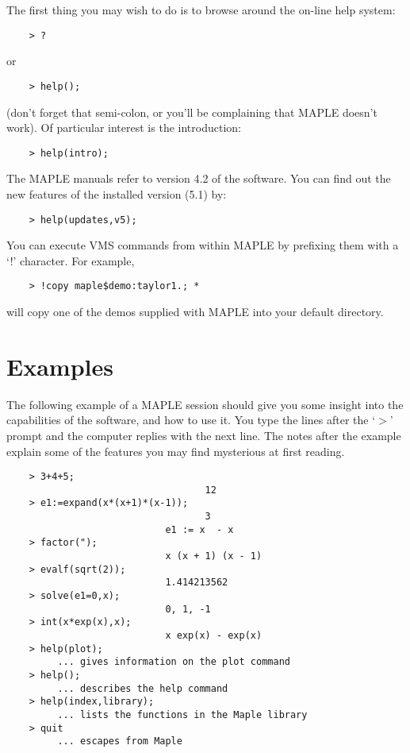 The first thing you may wish to do is to browse around the on-line help
system:

\begin{verbatim}
    > ?
\end{verbatim}

or

\begin{verbatim}
    > help();
\end{verbatim}

(don't forget that semi-colon, or you'll be complaining that MAPLE
doesn't work). Of particular interest is the introduction:

\begin{verbatim}
    > help(intro);
\end{verbatim}

The MAPLE manuals refer to version 4.2 of the software. You can find out
the new features of the installed version (5.1) by:

\begin{verbatim}
    > help(updates,v5);
\end{verbatim}

You can execute VMS commands from within MAPLE by prefixing them with a
`!' character. For example,

\begin{verbatim}
    > !copy maple$demo:taylor1.; *
\end{verbatim}

will copy one of the demos supplied with MAPLE into your default
directory.

\section{Examples}

The following example of a MAPLE session should give you some insight
into the capabilities of the software, and how to use it. You type the
lines after the `$>$' prompt and the computer replies with the next line.
The notes after the example explain some of the features you may find
mysterious at first reading.

\begin{verbatim}
    > 3+4+5;
                                   12
    > e1:=expand(x*(x+1)*(x-1));
                                   3
                            e1 := x  - x
    > factor(");
                            x (x + 1) (x - 1)
    > evalf(sqrt(2));
                            1.414213562
    > solve(e1=0,x);
                            0, 1, -1
    > int(x*exp(x),x);
                            x exp(x) - exp(x)
    > help(plot);
         ... gives information on the plot command
    > help();
         ... describes the help command
    > help(index,library);
         ... lists the functions in the Maple library
    > quit
         ... escapes from Maple
\end{verbatim}

